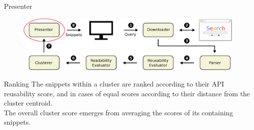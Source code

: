 \documentclass[compress]{beamer}
\begin{document}

\begin{frame}{Presenter}

\vspace{-20pt}
\begin{figure}[t]
\includegraphics[scale=0.35]{presenter}
\end{figure}


\begin{exampleblock}{Ranking}
The snippets within a cluster are ranked according to their API reusability score, and in cases of equal scores according to their distance from the cluster centroid.\\
The overall cluster score emerges from averaging the scores of its containing snippets. 
\end{exampleblock}

\end{frame}
\end{document}
